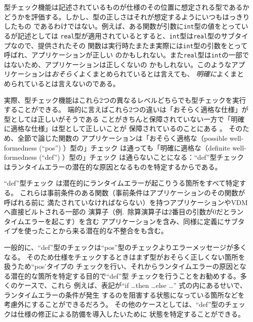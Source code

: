 \documentclass[\pformat,12pt]{jarticle}
\newcommand{\aaa}{\tt }
\begin{document}
  
型チェック機能は記述されているものが仕様のその位置に想定される型であるか
どうかを評価する。しかし、型の正しさはそれが想定するようにいつもはっきりしたもの
であるわけではない。例えば、ある関数が引数に{\aaa int}型の値をとっているが記述としては
{\aaa real}型が適用されているとすると、{\aaa int}型は{\aaa real}型のサブタイプなので、提供されたその
関数は実行時たまたま実際には{\aaa int}型の引数をとって呼ばれ、アプリケーションが正しい
のかもしれない。また{\aaa real}型は{\aaa int}の一部ではないため、アプリケーションは正しくないの
かもしれない。このようなアプリケーションは{\em おそらく\/}よくまとめられているとは言えても、
{\em 明確に\/}よくまとめられているとは言えないのである。

実際、型チェック機能はこれら2つの異なるレベルどちらでも型チェックを実行することができる。
端的に言えばこれら2つの違いは「おそらく適格な仕様」が型としては正しいがそうである
ことがきちんと保障されていない一方で「明確に適格な仕様」は型として正しいことが
保障されているのことにある
。
そのため、全節で論じた関数の
アプリケーションは「おそらく適格な（possible well-formedness (``pos'') ）型の」チェック 
は通っても「明確に適格な（definite well-formedness (``def'') ）型の」チェック 
は通らないことになる：``def''型チェックはランタイムエラーの潜在的な原因となるものを特定するからである。

``def''型チェック  は潜在的にランタイムエラーが起こりうる箇所をすべて特定する。
これらは事前条件のある関数（事前条件はアプリケーションのその関数が呼ばれる前に
満たされていなければならない）を持つアプリケーションやVDMへ直接ビルトされる一部の
演算子（例.\ 除算演算子は2番目の引数が0だとランタイムエラーを起こす）を含む
アプリケーションを含み、同様に定義にサブタイプを使ったことから来る潜在的な不整合をも含む。

一般的に、``def''型のチェックは``pos''型のチェックよりエラーメッセージが多くなる。
そのため仕様をチェックするときはまず型がおそらく正しくない箇所を扱うため``pos'タイプの
チェックを行い、それからランタイムエラーの原因となる潜在的な箇所を特定する目的で``def''型
チェックを行うことをお勧めする。多くのケースで、これら
例えば、表記が``if \ldots then \ldots else \ldots'' 式の内にあるせいで、ランタイムエラーの条件が発生
するのを阻害する状態になっている箇所などを考慮外にすることができるだろう。
その他のケースとしては、``def''型のチェックは仕様の修正による防備を導入したいために
状態を特定することができる。
\end{document}
